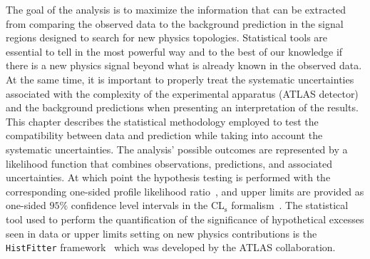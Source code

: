 The goal of the analysis is to maximize the information that can be 
extracted from comparing the observed data to the background 
prediction in the signal regions designed to search for new physics 
topologies. Statistical tools are essential to tell in the most 
powerful way and to the best of our knowledge if there is a new physics 
signal beyond what is already known in the observed data. 
At the same time, it is important to properly treat the systematic 
uncertainties associated with the complexity of the experimental 
apparatus (ATLAS detector) and the background predictions when 
presenting an interpretation of the results. 
This chapter describes the statistical methodology employed to 
test the compatibility between data and prediction while taking into 
account the systematic uncertainties. 
The analysis' possible outcomes are represented by a likelihood function 
that combines observations, predictions, and associated uncertainties. 
At which point the 
hypothesis testing is performed with the corresponding one-sided profile 
likelihood ratio~\cite{Cowan:2010js}, 
and upper limits are provided as one-sided $95\%$ confidence level intervals in the CL$_\text{s}$ formalism~\cite{Read:2002}. 
The statistical tool used to perform the quantification of the significance 
of hypothetical excesses seen in data
or upper limits setting on new physics contributions is the \texttt{HistFitter} 
framework~\cite{Baak:2014wma} which was developed by the ATLAS collaboration.



